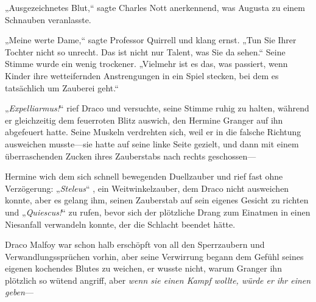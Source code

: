 „Ausgezeichnetes Blut,“ sagte Charles Nott anerkennend, was Augusta zu einem Schnauben veranlasste.

„Meine werte Dame,“ sagte Professor Quirrell und klang ernst. „Tun Sie Ihrer Tochter nicht so unrecht. Das ist nicht nur Talent, was Sie da sehen.“ Seine Stimme wurde ein wenig trockener. „Vielmehr ist es das, was passiert, wenn Kinder ihre wetteifernden Anstrengungen in ein Spiel stecken, bei dem es tatsächlich um Zauberei geht.“

\later

„\emph{Expelliarmus!}“ rief Draco und versuchte, seine Stimme ruhig zu halten, während er gleichzeitig dem feuerroten Blitz auswich, den Hermine Granger auf ihn abgefeuert hatte. Seine Muskeln verdrehten sich, weil er in die falsche Richtung ausweichen musste—sie hatte auf seine linke Seite gezielt, und dann mit einem überraschenden Zucken ihres Zauberstabs nach rechts geschossen—

Hermine wich dem sich schnell bewegenden Duellzauber und rief fast ohne Verzögerung: „\emph{Steleus}“ , ein Weitwinkelzauber, dem Draco nicht ausweichen konnte, aber es gelang ihm, seinen Zauberstab auf sein eigenes Gesicht zu richten und „\emph{Quiescus!}“ zu rufen, bevor sich der plötzliche Drang zum Einatmen in einen Niesanfall verwandeln konnte, der die Schlacht beendet hätte.

Draco Malfoy war schon halb erschöpft von all den Sperrzaubern und Verwandlungssprüchen vorhin, aber seine Verwirrung begann dem Gefühl seines eigenen kochendes Blutes zu weichen, er wusste nicht, warum Granger ihn plötzlich so wütend angriff, aber \emph{wenn sie einen Kampf wollte, würde er ihr einen geben}—

